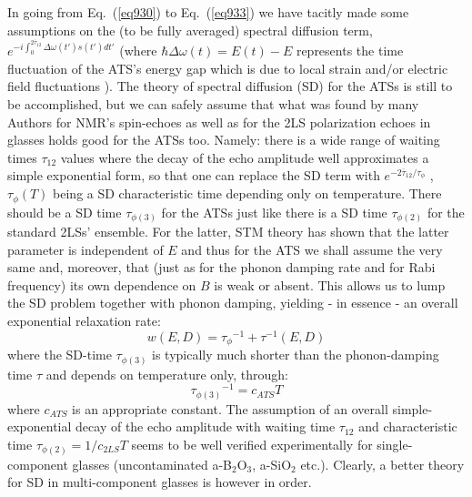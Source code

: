 \documentclass[10pt]{article}
\begin{document}
In going from Eq.~(\ref{eq930}) to Eq.~(\ref{eq933}) we have tacitly made some 
assumptions on the (to be fully averaged) spectral diffusion term,  
$e^{-i\int^{2{\overline{\tau }}_{12}}_0{\Delta \omega \left(t'\right)s\left(t'\right)dt'}}$
(where $\hbar\Delta \omega(t)=E(t)-E$ represents the time fluctuation of the ATS's 
energy gap which is due to local strain and/or electric field fluctuations \cite{Bla1977}). 
The theory of spectral diffusion (SD) \cite{Bla1977} for the ATSs is still to be 
accomplished, but we can safely assume that what was found by many Authors for 
NMR's spin-echoes as well as for the 2LS polarization echoes in glasses holds good 
for the ATSs too. Namely: there is a wide range of waiting times ${\tau }_{12}$ 
values where the decay of the echo amplitude well approximates a simple exponential 
form, so that one can replace the SD term with 
$e^{-{2{\overline{\tau }}_{12}}/{{\tau }_\phi}}$ , ${\tau }_\phi(T)$ 
being  a SD characteristic time depending only on temperature. There should be a 
SD time ${\tau }_{\phi(3)}$ for the ATSs just like there is a SD time 
${\tau }_{\phi(2)}$ for the standard 2LSs' ensemble. For the latter, STM theory 
has shown \cite{Gal1988,Bla1977} that the latter parameter is independent of $E$ 
and thus for the ATS we shall assume the very same and, moreover, that (just as for 
the phonon damping rate and for Rabi frequency) its own dependence on $B$ is 
weak or absent. This allows us to lump the SD problem together with phonon 
damping, yielding - in essence - an overall exponential relaxation rate:
\begin{equation}
w(E,D)={{\tau }_\phi}^{-1}+{\tau }^{-1}(E,D)
\label{eq935}
\end{equation}
where the SD-time ${\tau }_{\phi(3)}$ is typically much shorter than the 
phonon-damping time $\tau $ and depends on temperature only, through:
\begin{equation}
{{\tau }_{\phi(3)}}^{-1}=c_{ATS}T
\end{equation}
where $c_{ATS}$ is an appropriate constant. The assumption of an overall 
simple-exponential decay of the echo amplitude with waiting time 
${\tau }_{12}$ and characteristic time ${\tau}_{\phi(2)}=1/c_{2LS}T$ seems 
to be well verified experimentally \cite{Ens1996} for single-component glasses 
(uncontaminated a-B$_2$O$_3$, a-SiO$_2$ etc.). Clearly, a better theory for SD
in multi-component glasses is however in order.
\end{document}
